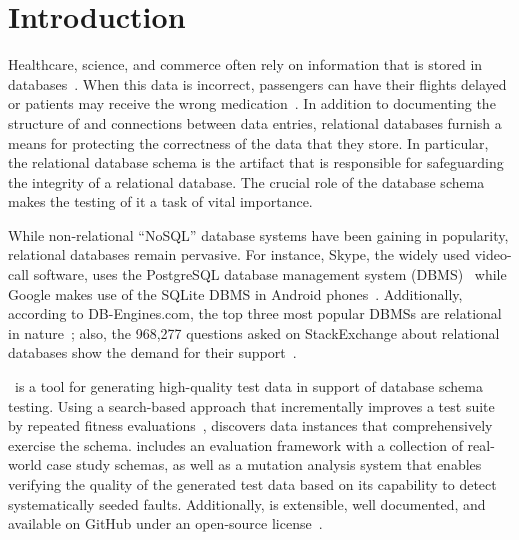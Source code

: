 \section{Introduction}\label{sec:intro}


Healthcare, science, and commerce often rely on information that is stored in
databases~\cite{kapfhammer2007comprehensive}.  When this data is incorrect, passengers can have their flights delayed or
patients may receive the wrong medication~\cite{databasebook}.  In addition to documenting the structure of and
connections between data entries, relational databases furnish a means for protecting the correctness of the data that
they store.  In particular, the relational database schema is the artifact that is responsible for safeguarding the
integrity of a relational database. The crucial role of the database schema makes the testing of it a task of vital
importance.


While non-relational ``NoSQL'' database systems have been gaining in popularity, relational databases remain pervasive.
For instance, Skype, the widely used video-call software, uses the PostgreSQL database management system
(DBMS)~\cite{postgres} while Google makes use of the SQLite DBMS in Android phones~\cite{sqlite}.  Additionally,
according to DB-Engines.com, the top three most popular DBMSs are relational in nature~\cite{dbrank}; also, the 968,277
questions asked on StackExchange about relational databases show the demand for their support~\cite{stackexchange}.



\sa~is a tool for generating high-quality test data in support of database schema testing. Using a search-based approach
that incrementally improves a test suite by repeated fitness evaluations~\cite{Korel:AVM}, {\sa} discovers data instances
that comprehensively exercise the schema.  {\sa} includes an evaluation framework with a collection of real-world case
study schemas, as well as a mutation analysis system that enables verifying the quality of the generated test data based
on its capability to detect systematically seeded faults.  Additionally, {\sa} is extensible, well documented, and
available on GitHub under an open-source license~\cite{tool}.


